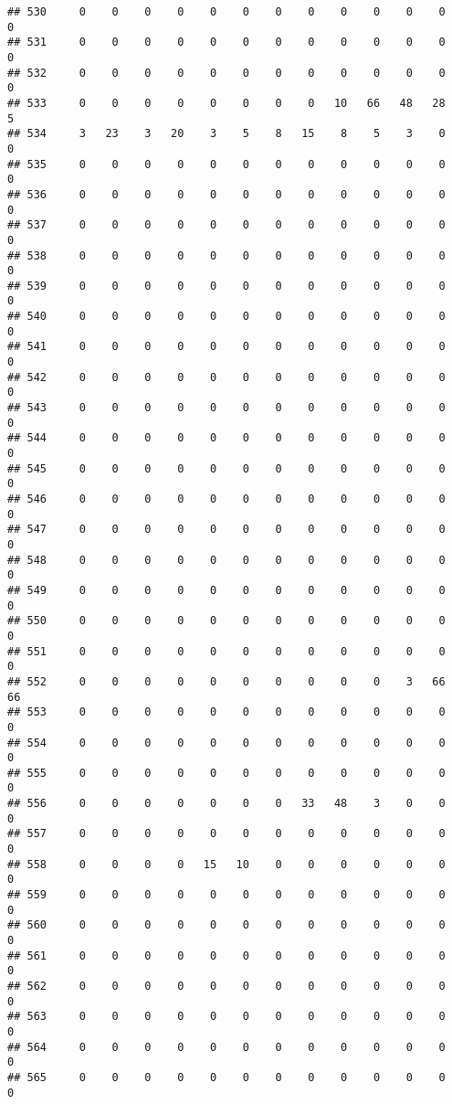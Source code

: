 \documentclass[]{article}
\begin{document}
\begin{verbatim}
## 530     0    0    0    0    0    0    0    0    0    0    0    0    0
## 531     0    0    0    0    0    0    0    0    0    0    0    0    0
## 532     0    0    0    0    0    0    0    0    0    0    0    0    0
## 533     0    0    0    0    0    0    0    0   10   66   48   28    5
## 534     3   23    3   20    3    5    8   15    8    5    3    0    0
## 535     0    0    0    0    0    0    0    0    0    0    0    0    0
## 536     0    0    0    0    0    0    0    0    0    0    0    0    0
## 537     0    0    0    0    0    0    0    0    0    0    0    0    0
## 538     0    0    0    0    0    0    0    0    0    0    0    0    0
## 539     0    0    0    0    0    0    0    0    0    0    0    0    0
## 540     0    0    0    0    0    0    0    0    0    0    0    0    0
## 541     0    0    0    0    0    0    0    0    0    0    0    0    0
## 542     0    0    0    0    0    0    0    0    0    0    0    0    0
## 543     0    0    0    0    0    0    0    0    0    0    0    0    0
## 544     0    0    0    0    0    0    0    0    0    0    0    0    0
## 545     0    0    0    0    0    0    0    0    0    0    0    0    0
## 546     0    0    0    0    0    0    0    0    0    0    0    0    0
## 547     0    0    0    0    0    0    0    0    0    0    0    0    0
## 548     0    0    0    0    0    0    0    0    0    0    0    0    0
## 549     0    0    0    0    0    0    0    0    0    0    0    0    0
## 550     0    0    0    0    0    0    0    0    0    0    0    0    0
## 551     0    0    0    0    0    0    0    0    0    0    0    0    0
## 552     0    0    0    0    0    0    0    0    0    0    3   66   66
## 553     0    0    0    0    0    0    0    0    0    0    0    0    0
## 554     0    0    0    0    0    0    0    0    0    0    0    0    0
## 555     0    0    0    0    0    0    0    0    0    0    0    0    0
## 556     0    0    0    0    0    0    0   33   48    3    0    0    0
## 557     0    0    0    0    0    0    0    0    0    0    0    0    0
## 558     0    0    0    0   15   10    0    0    0    0    0    0    0
## 559     0    0    0    0    0    0    0    0    0    0    0    0    0
## 560     0    0    0    0    0    0    0    0    0    0    0    0    0
## 561     0    0    0    0    0    0    0    0    0    0    0    0    0
## 562     0    0    0    0    0    0    0    0    0    0    0    0    0
## 563     0    0    0    0    0    0    0    0    0    0    0    0    0
## 564     0    0    0    0    0    0    0    0    0    0    0    0    0
## 565     0    0    0    0    0    0    0    0    0    0    0    0    0

\end{verbatim}
\end{document}
